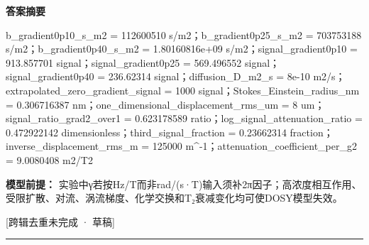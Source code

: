 \documentclass[UTF8,11pt,a4paper]{ctexart}
\begin{document}
\noindent\textbf{答案摘要}\par
b\_gradient0p10\_s\_m2 = 112600510 s/m2；b\_gradient0p25\_s\_m2 = 703753188 s/m2；b\_gradient0p40\_s\_m2 = 1.80160816e+09 s/m2；signal\_gradient0p10 = 913.857701 signal；signal\_gradient0p25 = 569.496552 signal；signal\_gradient0p40 = 236.62314 signal；diffusion\_D\_m2\_s = 8e-10 m2/s；extrapolated\_zero\_gradient\_signal = 1000 signal；Stokes\_Einstein\_radius\_nm = 0.306716387 nm；one\_dimensional\_displacement\_rms\_um = 8 um；signal\_ratio\_grad2\_over1 = 0.623178589 ratio；log\_signal\_attenuation\_ratio = 0.472922142 dimensionless；third\_signal\_fraction = 0.23662314 fraction；inverse\_displacement\_rms\_m = 125000 m\textasciicircum{}-1；attenuation\_coefficient\_per\_g2 = 9.0080408 m2/T2\par
\noindent\textbf{模型前提：}
实验中γ若按Hz/T而非rad/(s·T)输入须补2π因子；高浓度相互作用、受限扩散、对流、涡流梯度、化学交换和T₂衰减变化均可使DOSY模型失效。\par
\noindent\textcolor{red!65!black}{[跨辑去重未完成 · 草稿]} \par
\medskip\hrule\medskip
{}
\end{document}
